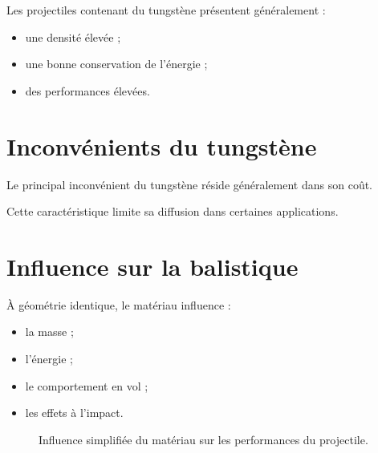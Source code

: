 Les projectiles contenant du tungstène présentent généralement :

\begin{itemize}
    \item une densité élevée ;
    \item une bonne conservation de l'énergie ;
    \item des performances élevées.
\end{itemize}

\section{Inconvénients du tungstène}

Le principal inconvénient du tungstène réside généralement dans son coût.

Cette caractéristique limite sa diffusion dans certaines applications.

\section{Influence sur la balistique}

À géométrie identique, le matériau influence :

\begin{itemize}
    \item la masse ;
    \item l'énergie ;
    \item le comportement en vol ;
    \item les effets à l'impact.
\end{itemize}

\begin{figure}[htbp]
\centering


\caption{Influence simplifiée du matériau sur les performances du projectile.}
\label{fig:chaine_materiau_performances}

\end{figure}

